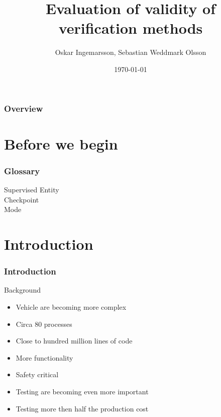\documentclass{beamer}
\title{Evaluation of validity of verification methods}
\author{Oskar Ingemarsson, Sebastian Weddmark Olsson}
\institute{Chalmers University of Technology, Mecel AB}
\date{\today}
\begin{document}
\begin{frame}
  \titlepage
\end{frame}

\begin{frame}
  \frametitle{Overview}
  \tableofcontents
\end{frame}

\section{Before we begin}

\begin{frame}
  \frametitle{Glossary}
  \begin{description}
    \item[Supervised Entity]
    \item[Checkpoint]
    \item[Mode]
  \end{description}
\end{frame}


\section{Introduction}

\begin{frame}[fragile]
  \frametitle{Introduction}
  \begin{block}{Background}
    \begin{itemize}
        \item Vehicle are becoming more complex
        \item Circa 80 processes
        \item Close to hundred million lines of code
        \item More functionality
        \item Safety critical
        \item Testing are becoming even more important
        \item Testing more then half the production cost
    \end{itemize}
   \end{block}
\end{frame}
\end{document}
